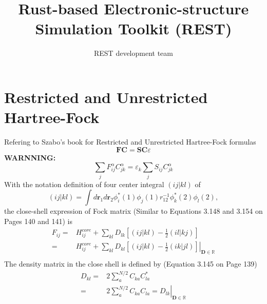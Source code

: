 \documentclass[a4paper,12pt]{article}
\title{Rust-based Electronic-structure Simulation Toolkit (REST)}
\author{REST development team}
\begin{document}
\maketitle




\newpage
\section{Restricted and Unrestricted Hartree-Fock}
Refering to Szabo's book for Restricted and Unrestricted Hartree-Fock formulas 
\begin{equation}
	\boldsymbol{F}\boldsymbol{C}=\boldsymbol{S}\boldsymbol{C}\varepsilon
\end{equation}
\textbf{WARNNING:}
\begin{equation}
	\sum_{j}F_{ij}^{\alpha}C_{jk}^{\alpha} = \varepsilon_k\sum_{j}S_{ij}C_{jk}^{\alpha}
\end{equation}
With the notation definition of four center integral $\left( ij|kl \right)$ of
\begin{equation}
	\left( ij|kl \right) = \int d\textbf{r}_1d\textbf{r}_2 \phi_{i}^{*}(1)\phi_{j}(1)r_{12}^{-1}\phi_{k}^{*}(2)\phi_{l}(2),
\end{equation}
the close-shell expression of Fock matrix (Similar to Equations 3.148 and 3.154 on Pages 140 and 141) is 
\begin{equation}
	\begin{split}
	F_{ij}=&H_{ij}^{core}+\sum_{kl}D_{lk}\left[\left( ij|kl \right)-\frac{1}{2}\left(il|kj  \right)\right] \\
	=&\left.H_{ij}^{core}+\sum_{kl}D_{kl}\left[\left( ij|kl \right)-\frac{1}{2}\left(ik|jl  \right)\right]\right|_{\textbf{D} \in \mathbb{R}} \\
    \end{split}
\end{equation}
The density matrix in the close shell is defined by (Equation 3.145 on Page 139)
\begin{equation}
	\begin{split}
		D_{kl}=&2\sum_{a}^{N/2}C_{ka}C_{la}^{*}\\
		=&\left.2\sum_{a}^{N/2}C_{ka}C_{la}=D_{lk}\right|_{\textbf{D}\in \mathbb{R}}\\
    \end{split}
\end{equation}
\end{document}
